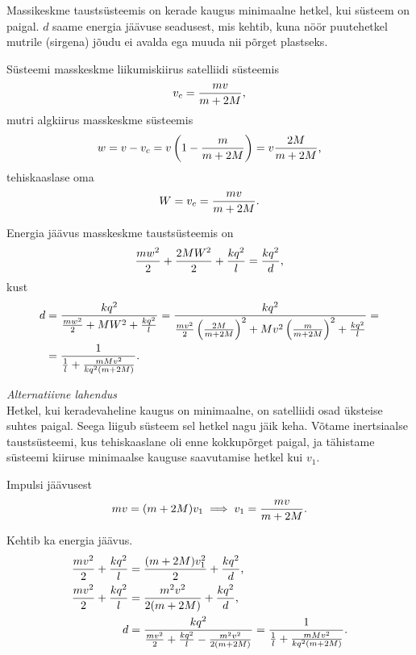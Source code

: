 \documentclass[10pt, twoside]{article}
\begin{document}
{%

\solu
Massikeskme taustsüsteemis on kerade kaugus minimaalne hetkel, kui süsteem on
paigal. $d$ saame energia jäävuse seadusest, mis kehtib, kuna nöör puutehetkel
mutrile (sirgena) jõudu ei avalda ega muuda nii põrget plastseks.

Süsteemi masskeskme liikumiskiirus satelliidi süsteemis
\[ v_c = \frac{m v}{m+2M} \text, \]
mutri algkiirus masskeskme süsteemis
\[ w = v - v_c = v \left(1 - \frac{m}{m+2M}\right) = v \frac{2M}{m+2M} \text, \]
tehiskaaslase oma
\[ W = v_c = \frac{m v}{m+2M} \text. \]

Energia jäävus masskeskme taustsüsteemis on
\[
\frac{m w^2}{2} + \frac{2M W^2}{2} + \frac{k q^2}{l} = \frac{k q^2}{d} \text,
\]
kust
\begin{align*}
d &= \frac{k q^2}{\frac{m w^2}{2} + M W^2 + \frac{k q^2}{l}} =
\frac{k q^2}{\frac{m v^2}{2} \left(\frac{2M}{m+2M}\right)^2 + M v^2
	\left(\frac{m}{m+2M}\right)^2 + \frac{k q^2}{l}} = \\
&= \frac{1}{\frac{1}{l} + \frac{m M v^2}{k q^2 (m+2M)}}
\text.
\end{align*}

\vspace{0.5\baselineskip}

\emph{Alternatiivne lahendus}\\
Hetkel, kui keradevaheline kaugus on minimaalne, on satelliidi osad üksteise
suhtes paigal. Seega liigub süsteem sel hetkel nagu jäik keha. Võtame
inertsiaalse taustsüsteemi, kus tehiskaaslane oli enne kokkupõrget paigal, ja
tähistame süsteemi kiiruse minimaalse kauguse saavutamise hetkel kui $v_1$.

Impulsi jäävusest
\[ m v = (m+2M) v_1 \implies v_1 = \frac{m v}{m+2M}\text. \]

Kehtib ka energia jäävus.
\begin{align*}
\frac{m v^2}{2} + \frac{k q^2}{l} &= \frac{(m+2M) v_1^2}{2} + \frac{k q^2}{d}
\text, \\
\frac{m v^2}{2} + \frac{k q^2}{l} &= \frac{m^2 v^2}{2 (m+2M)} + \frac{k q^2}{d}
\text, \\
d &= \frac{k q^2}{\frac{m v^2}{2} + \frac{k q^2}{l} - \frac{m^2 v^2}{2 (m+2M)}}
= \frac{1}{\frac{1}{l} + \frac{m M v^2}{k q^2 (m+2M)}} \text.
\end{align*}
\probend
\bigskip


}
\end{document}
